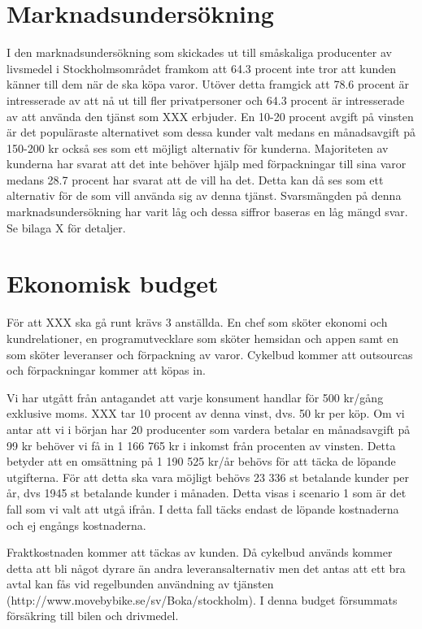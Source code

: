 \documentclass[10pt,a4paper,oneside]{article}
\begin{document}
\newpage

\section{Marknadsundersökning}
I den marknadsundersökning som skickades ut till småskaliga producenter av livsmedel i Stockholmsområdet framkom att 64.3 procent inte tror att kunden känner till dem när de ska köpa varor. Utöver detta framgick att 78.6 procent är intresserade av att nå ut till fler privatpersoner och 64.3 procent är intresserade av att använda den tjänst som XXX erbjuder. En 10-20 procent avgift på vinsten är det populäraste alternativet som dessa kunder valt medans en månadsavgift på 150-200 kr också ses som ett möjligt alternativ för kunderna. Majoriteten av kunderna har svarat att det inte behöver hjälp med förpackningar till sina varor medans 28.7 procent har svarat att de vill ha det. Detta kan då ses som ett alternativ för de som vill använda sig av denna tjänst. Svarsmängden på denna marknadsundersökning har varit låg och dessa siffror baseras en låg mängd svar. Se bilaga X för detaljer. 

\newpage

\section{Ekonomisk budget}
För att XXX ska gå runt krävs 3 anställda. En chef som sköter ekonomi och kundrelationer, en programutvecklare som sköter hemsidan och appen samt en som sköter leveranser och förpackning av varor. Cykelbud kommer att outsourcas och förpackningar kommer att köpas in. 

Vi har utgått från antagandet att varje konsument handlar för 500 kr/gång exklusive moms. XXX tar 10 procent av denna vinst, dvs. 50 kr per köp. Om vi antar att vi i början har 20 producenter som vardera betalar en månadsavgift på 99 kr behöver vi få in 1 166 765 kr i inkomst från procenten av vinsten. Detta betyder att en omsättning på 1 190 525 kr/år behövs för att täcka de löpande utgifterna. För att detta ska vara möjligt behövs 23 336 st betalande kunder per år, dvs 1945 st betalande kunder i månaden. Detta visas i scenario 1 som är det fall som vi valt att utgå ifrån. I detta fall täcks endast de löpande kostnaderna och ej engångs kostnaderna. 

Fraktkostnaden kommer att täckas av kunden. Då cykelbud används kommer detta att bli något dyrare än andra leveransalternativ men det antas att ett bra avtal kan fås vid regelbunden användning av tjänsten (http://www.movebybike.se/sv/Boka/stockholm). I denna budget försummats försäkring till bilen och drivmedel. 
\end{document}
